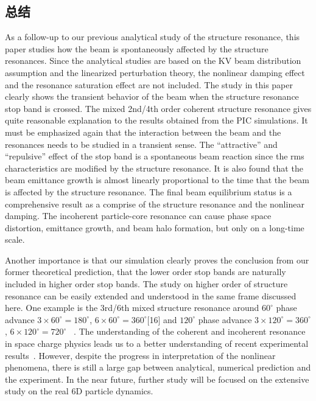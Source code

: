 \subsection{总结}
\label{section:Crossing_Summary}
As a follow-up to our previous analytical study of the structure resonance,
this paper studies how the beam is spontaneously affected by the structure
resonances. Since the analytical studies are based on the KV beam distribution
assumption and the linearized perturbation theory, the nonlinear damping effect
and the resonance saturation effect are not included.  The study in this paper
clearly shows the transient behavior of the beam when the structure resonance
stop band is crossed. The mixed 2nd/4th order coherent structure resonance
gives quite reasonable explanation to the results obtained from the PIC
simulations. It must be emphasized again that the interaction between the beam
and the resonances needs to be studied in a transient sense. The ``attractive''
and ``repulsive'' effect of the stop band is a spontaneous beam reaction since
the rms characteristics are modified by the structure resonance. It is also
found that the beam emittance growth is almost linearly proportional to the
time that the beam is affected by the structure resonance. The final beam
equilibrium status is a comprehensive result as a comprise of the structure
resonance and the nonlinear damping. The incoherent particle-core resonance
can cause phase space distortion, emittance growth, and beam halo formation,
but only on a long-time scale.

Another importance is that our simulation clearly proves the conclusion from
our former theoretical prediction, that the lower order stop bands are
naturally included in higher order stop bands.  The study on higher order of
structure resonance can be easily extended and understood in the same frame
discussed here.
One example is the 3rd/6th mixed structure resonance around $60^{\circ}$
phase advance $3 \times 60^{\circ} = 180^{\circ}$,
$6 \times 60^{\circ} = 360^{\circ}$[16] and $120^{\circ}$ phase advance
$3 \times 120^{\circ} = 360^{\circ}$, $6 \times 120^{\circ} = 720^{\circ}$
~\cite{11,36}. The understanding of the coherent and incoherent resonance in
space charge physics leads us to a better understanding of recent experimental
results~\cite{31,32,33}. However, despite the progress in interpretation of the
nonlinear phenomena, there is still a large gap between analytical, numerical
prediction and the experiment. In the near future, further study will be focused
on the extensive study on the real 6D particle dynamics.

